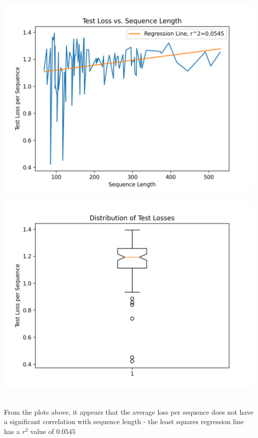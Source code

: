 \documentclass[11pt]{article}
\begin{document}
\begin{minipage}{0.45\textwidth}
\includegraphics[scale=0.5]{loss_seqs.png}
\end{minipage}
\hfill
\begin{minipage}{0.45\textwidth}
\includegraphics[scale=0.5]{loss_boxplot.png}
\end{minipage}\\[2mm]
From the plots above, it appears that the average loss per sequence does not have a significant correlation with sequence length - the least squares regression line has a $r^{2}$ value of $0.0545$
\end{document}
